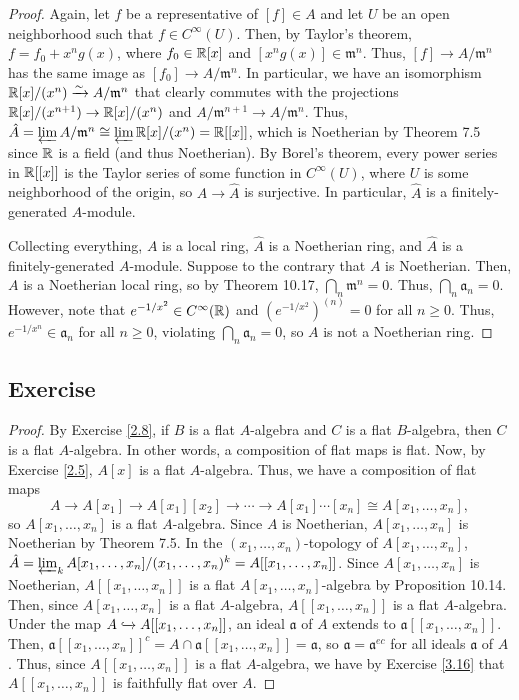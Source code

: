 \begin{proof}
Again, let $f$ be a representative of $[f] \in A$ and let $U$ be an open neighborhood such that $f \in C^{\infty}(U)$. Then, by Taylor's theorem,
$f = f_0 + x^n g(x)$, where $f_0 \in \mathbb{R}[x]$ and $[x^n g(x)] \in \mathfrak{m}^n$. Thus, $[f] \to A/\mathfrak{m}^n$ has the same
image as $[f_0] \to A/\mathfrak{m}^n$. In particular, we have an isomorphism $\mathbb{R}[x]/(x^n) \xrightarrow{\sim} A/\mathfrak{m}^n$
that clearly commutes with the projections $\mathbb{R}[x]/(x^{n+1}) \to \mathbb{R}[x]/(x^n)$ and $A/\mathfrak{m}^{n+1} \to A/\mathfrak{m}^n$. Thus,
$\hat A = \varprojlim A/\mathfrak{m}^n \cong \varprojlim \mathbb{R}[x]/(x^n) = \mathbb{R}[[x]]$, which is Noetherian by Theorem 7.5 since $\mathbb{R}$ is a field
(and thus Noetherian). By Borel's theorem, every power series in $\mathbb{R}[[x]]$ is the Taylor series of some function in $C^{\infty}(U)$,
where $U$ is some neighborhood of the origin, so $A \to \hat A$ is surjective. In particular, $\hat A$ is a finitely-generated $A$-module.

Collecting everything, $A$ is a local ring, $\hat A$ is a Noetherian ring, and $\hat A$ is a finitely-generated $A$-module. Suppose to the
contrary that $A$ is Noetherian. Then, $A$ is a Noetherian local ring, so by Theorem 10.17, $\bigcap_n \mathfrak{m}^n = 0$.
Thus, $\bigcap_n \mathfrak{a}_n = 0$. However, note that $e^{-1/x^2} \in C^{\infty}(\mathbb{R})$ and $(e^{-1/x^2})^{(n)} = 0$ for all $n \ge 0$. Thus,
$e^{-1/x^n} \in \mathfrak{a}_n$ for all $n \ge 0$, violating $\bigcap_n \mathfrak{a}_n = 0$, so $A$ is not a Noetherian ring.
\end{proof}

\subsection{Exercise}\label{10.12}

\begin{proof}
By Exercise \ref{2.8}, if $B$ is a flat $A$-algebra and $C$ is a flat $B$-algebra, then $C$ is a flat $A$-algebra. In other words,
a composition of flat maps is flat. Now, by Exercise \ref{2.5}, $A[x]$ is a flat $A$-algebra. Thus, we have a composition of flat maps
$$A \to A[x_1] \to A[x_1][x_2] \to \cdots \to A[x_1]\cdots[x_n] \cong A[x_1,\ldots,x_n],$$
so $A[x_1,\ldots,x_n]$ is a flat $A$-algebra. Since $A$ is Noetherian, $A[x_1,\ldots,x_n]$ is Noetherian by Theorem 7.5. In the 
$(x_1,\ldots,x_n)$-topology of $A[x_1,\ldots,x_n]$, $\hat A = \varprojlim_k A[x_1,\ldots,x_n]/(x_1,\ldots,x_n)^k = A[[x_1,\ldots,x_n]]$.
Since $A[x_1,\ldots,x_n]$ is Noetherian, $A[[x_1,\ldots,x_n]]$ is a flat $A[x_1,\ldots,x_n]$-algebra by Proposition 10.14. Then, since
$A[x_1,\ldots,x_n]$ is a flat $A$-algebra, $A[[x_1,\ldots,x_n]]$ is a flat $A$-algebra. 
Under the map $A \xhookrightarrow{} A[[x_1,\ldots,x_n]]$, an ideal $\mathfrak{a}$ of $A$ extends to 
$\mathfrak{a}[[x_1,\ldots,x_n]]$. Then, $\mathfrak{a}[[x_1,\ldots,x_n]]^c = A \cap \mathfrak{a}[[x_1,\ldots,x_n]] = \mathfrak{a}$,
so $\mathfrak{a} = \mathfrak{a}^{ec}$ for all ideals $\mathfrak{a}$ of $A$. Thus, since $A[[x_1,\ldots,x_n]]$ is a flat $A$-algebra,
we have by Exercise \ref{3.16} that $A[[x_1,\ldots,x_n]]$ is faithfully flat over $A$.
\end{proof}
